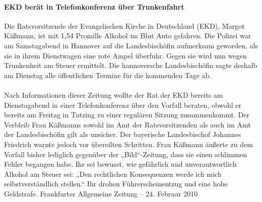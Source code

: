\documentclass[a4paper,12pt,twoside]{scrbook}
\begin{document}
\paragraph{EKD berät in Telefonkonferenz über Trunkenfahrt}
Die Ratsvorsitzende der Evangelischen Kirche in Deutschland (EKD), Margot Käßmann, ist mit 1,54 Promille Alkohol im Blut Auto gefahren. Die Polizei war am Samstagabend in Hannover auf die Landesbischöfin aufmerksam geworden, als sie in ihrem Dienstwagen eine rote Ampel überfuhr. Gegen sie wird nun wegen Trunkenheit am Steuer ermittelt. Die hannoversche Landesbischöfin sagte deshalb am Dienstag alle öffentlichen Termine für die kommenden Tage ab.
\\\\
Nach Informationen dieser Zeitung wollte der Rat der EKD bereits am Dienstagabend in einer Telefonkonferenz über den Vorfall beraten, obwohl er bereits am Freitag in Tutzing zu einer regulären Sitzung zusammenkommt. Der Verbleib Frau Käßmanns sowohl im Amt der Ratsvorsitzenden als auch im Amt der Landesbischöfin gilt als unsicher. Der bayerische Landesbischof Johannes Friedrich warnte jedoch vor übereilten Schritten. Frau Käßmann äußerte zu dem Vorfall bisher lediglich gegenüber der „Bild“-Zeitung, dass sie einen schlimmen Fehler begangen habe. Ihr sei bewusst, wie gefährlich und unverantwortlich Alkohol am Steuer sei: „Den rechtlichen Konsequenzen werde ich mich selbstverständlich stellen.“ Ihr drohen Führerscheinentzug und eine hohe Geldstrafe.
\newpage
Frankfurter Allgemeine Zeitung \hfill -- \hfill 24. Februar 2010
\end{document}
